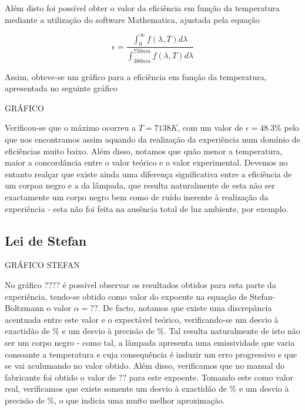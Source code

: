 \documentclass[9pt]{extarticle}
\begin{document}
\begin{multicols}{2}
\par Além disto foi possível obter o valor da eficiência em função da temperatura mediante a utilização do software Mathematica, ajustada pela equação

\begin{equation}
\epsilon=\frac{\int_0^\infty f(\lambda,T)d\lambda}{\int_{380nm}^{750nm} f(\lambda,T)d\lambda}
\end{equation}

\par Assim, obteve-se um gráfico para a eficiência em função da temperatura, apresentada no seguinte gráfico

GRÁFICO

\par Verificou-se que o máximo ocorreu a $T=7138K$, com um valor de $\epsilon=48.3\%$ pelo que nos encontramos assim aquando da realização da experiência num domínio de eficiências muito baixo. Além disso, notamos que quão menor a temperatura, maior a concordância entre o valor teórico e o valor experimental. Devemos no entanto realçar que existe ainda uma diferença significativa entre a eficiência de um corpoa negro e a da lâmpada, que resulta naturalmente de esta não ser exactamente um corpo negro bem como de ruído inerente à realização da experiência - esta não foi feita na ausência total de luz ambiente, por exemplo.

\subsection{Lei de Stefan}

GRÁFICO STEFAN

\par No gráfico ???? é possível observar os resultados obtidos para esta parte da experiência, tendo-se obtido como valor do expoente na equação de Stefan-Boltzmann o valor $\alpha=??$. De facto, notamos que existe uma discrepância acentuada entre este valor e o expectável teórico, verificando-se um desvio à exactidão de $\%$ e um desvio à precisão de $\%$. Tal resulta naturalmente de isto não ser um corpo negro - como tal, a lâmpada apresenta uma emissividade que varia consoante a temperatura e cuja consequência é induzir um erro progressivo e que se vai aculumando no valor obtido. Além disso, verificamos que no manual do fabricante foi obtido o valor de $??$ para este expoente. Tomando este como valor real, verificamos que existe somente um desvio à exactidão de $\%$ e um desvio à precisão de $\%$, o que indicia uma muito melhor aproximação.


\end{multicols}
\end{document}
